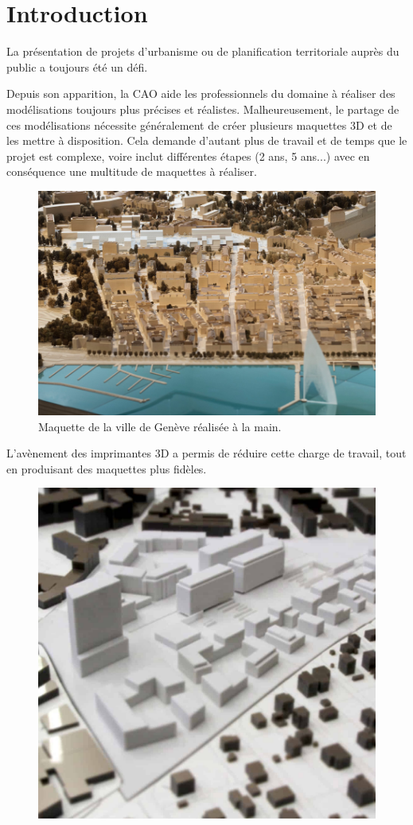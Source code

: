 \chapter{Introduction}

\label{Chapter1} %

La présentation de projets d'urbanisme ou de planification territoriale auprès du public a toujours été un défi. 

Depuis son apparition, la CAO aide les professionnels du domaine à réaliser des modélisations toujours plus précises et réalistes. 
Malheureusement, le partage de ces modélisations nécessite généralement de créer plusieurs maquettes 3D et de les mettre à disposition. Cela demande d'autant plus de travail et de temps que le projet est complexe, voire inclut différentes étapes (2 ans, 5 ans...) avec en conséquence une multitude de maquettes à réaliser.

\begin{figure}[h]
    \centering
    \includegraphics[width=0.8\linewidth]{Figures/geneva-model.png}
    \caption{Maquette de la ville de Genève réalisée à la main.}
    \label{fig:geneva-model}
\end{figure}

L'avènement des imprimantes 3D a permis de réduire cette charge de travail, tout en produisant des maquettes plus fidèles. 


\begin{figure}[ht]
    \centering
    \includegraphics[width=0.5\linewidth]{Figures/3d-printed-model.jpg}
    \label{fig:3d-printed-model}
\end{figure}

